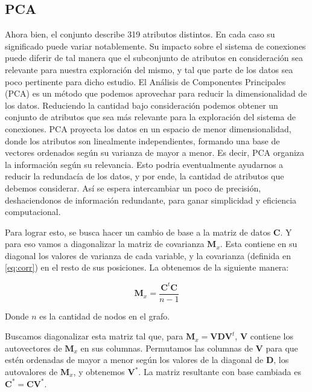 
\vspace{2em}
\subsection{PCA}

Ahora bien, el conjunto describe 319 atributos distintos.
En cada caso su significado puede variar notablemente.
Su impacto sobre el sistema de conexiones puede diferir de tal manera que el subconjunto de atributos en consideración
sea relevante para nuestra exploración del mismo, y tal que parte de los datos sea poco pertinente para dicho estudio.
El Análisis de Componentes Principales (PCA) es un método que podemos aprovechar para reducir la dimensionalidad de los datos.
Reduciendo la cantidad bajo consideración podemos obtener un conjunto de atributos que sea más relevante para la exploración del sistema de conexiones.
PCA proyecta los datos en un espacio de menor dimensionalidad, donde los atributos son linealmente independientes, formando una base de vectores ordenados según su varianza de mayor a menor.
Es decir, PCA organiza la información según su relevancia. Esto podria eventualmente ayudarnos a reducir la redundacía de los datos, y por ende, la cantidad de atributos que debemos considerar.
Así se espera intercambiar un poco de precisión, deshaciendonos de información redundante, para ganar simplicidad y eficiencia computacional.

Para lograr esto, se busca hacer un cambio de base a la matriz de datos $\textbf{C}$. 
Y para eso vamos a diagonalizar la matriz de covarianza $\textbf{M}_x$.
Esta contiene en su diagonal los valores de varianza de cada variable, y la covarianza (definida en \ref{eq:corr}) en el resto de sus posiciones.
La obtenemos de la siguiente manera:

\begin{equation}
	\textbf{M}_x = \frac{\textbf{C}^t\textbf{C}}{n-1}
\end{equation}

Donde $n$ es la cantidad de nodos en el grafo.

Buscamos diagonalizar esta matriz tal que, para $\textbf{M}_x = \textbf{V}\textbf{D}\textbf{V}^t$, $\textbf{V}$ contiene los autovectores de $\textbf{M}_x$ en sus columnas.
Permutamos las columnas de $\textbf{V}$ para que estén ordenadas de mayor a menor según los valores de la diagonal de $\textbf{D}$, los autovalores de $\textbf{M}_x$, y obtenemos $\textbf{V}^*$. 
La matriz resultante con base cambiada es $\textbf{C}^* = \textbf{C}\textbf{V}^*$.


